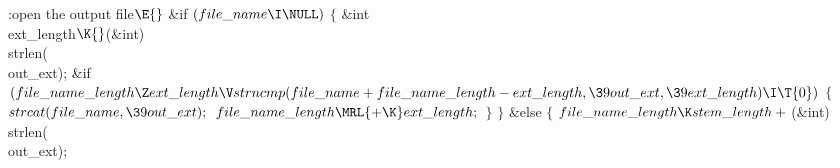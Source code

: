 \Y\B\4:open the output file\X${}\E{}$\6
\&{if} ${}(\index{file name+\\{file\_name}}\\{file\_name}\I\NULL){}$\5
\1${}\{{}$\5
\&{int} \\{ext\_length}${}\K{}$(\&{int}) \\{strlen}(\\{out\_ext});\7
\&{if} ${}(\index{file name length+\\{file\_name\_length}}\\{file\_name\_length}\Z\index{ext length+\\{ext\_length}}\\{ext\_length}\V\index{strncmp+\\{strncmp}}\\{strncmp}(\index{file name+\\{file\_name}}\\{file\_name}+\index{file name length+\\{file\_name\_length}}\\{file\_name\_length}-\index{ext length+\\{ext\_length}}\\{ext\_length},\39\index{out ext+\\{out\_ext}}\\{out\_ext},\39\index{ext length+\\{ext\_length}}\\{ext\_length})\I\T{0}){}$\5
\1${}\{{}$\5
${}\index{strcat+\\{strcat}}\\{strcat}(\index{file name+\\{file\_name}}\\{file\_name},\39\index{out ext+\\{out\_ext}}\\{out\_ext});{}$\6
${}\index{file name length+\\{file\_name\_length}}\\{file\_name\_length}\MRL{+{\K}}\index{ext length+\\{ext\_length}}\\{ext\_length};{}$\6
\4${}\}{}$\2\6
\4${}\}{}$\2\6
\&{else}\5
\1${}\{{}$\5
${}\index{file name length+\\{file\_name\_length}}\\{file\_name\_length}\K\index{stem length+\\{stem\_length}}\\{stem\_length}+{}$(\&{int}) \\{strlen}(\\{out\_ext});\6
